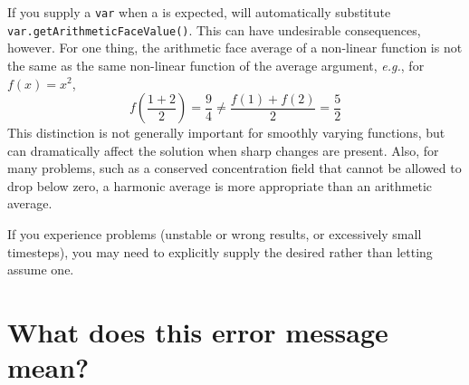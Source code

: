     
    \begin{reSTadmonition}[Note]
        If you supply a  \verb+var+ when a
         is expected, \FiPy{} will automatically
        substitute \verb+var.getArithmeticFaceValue()+.  This can have
        undesirable consequences, however. For one thing, the 
        arithmetic face average of a non-linear function is not the 
        same as the same non-linear function of the average argument, 
        \emph{e.g.}, for $f(x) = x^2$,
        \[ f(\frac{1+2}{2}) = \frac{9}{4} \neq 
        \frac{f(1) + f(2)}{2} = \frac{5}{2} \]
        This distinction is not generally important for smoothly
        varying functions, but can dramatically affect the solution
        when sharp changes are present.  Also, for many problems, such
        as a conserved concentration field that cannot be allowed to
        drop below zero, a harmonic average is more appropriate than
        an arithmetic average.
        
        If you experience problems (unstable or wrong results, or 
        excessively small timesteps), you may need to explicitly supply the 
        desired  rather than letting \FiPy{} 
        assume one.
    \end{reSTadmonition}
        
    \section{What does this error message mean?}\hspace*{\fill}
    
